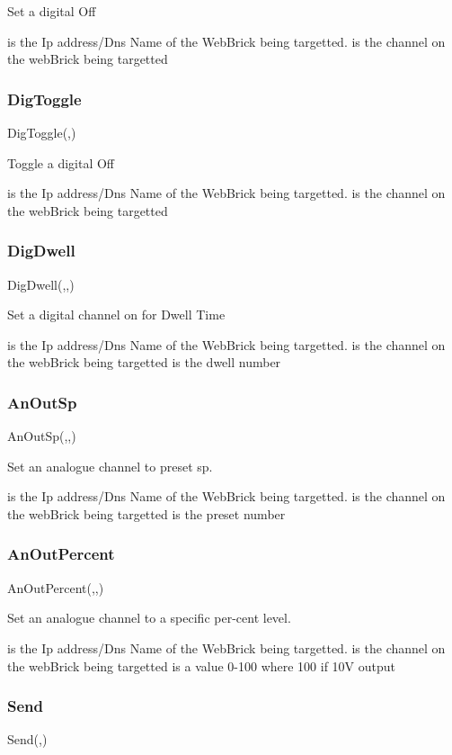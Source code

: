 Set a digital Off

     is the Ip address/Dns Name of the WebBrick being targetted.
     is the channel on the webBrick being targetted

\subsubsection{DigToggle}
DigToggle(,)

Toggle a digital Off

     is the Ip address/Dns Name of the WebBrick being targetted.
     is the channel on the webBrick being targetted

\subsubsection{DigDwell}
DigDwell(,,)

Set a digital channel on for Dwell Time

     is the Ip address/Dns Name of the WebBrick being targetted.
     is the channel on the webBrick being targetted
     is the dwell number

\subsubsection{AnOutSp}
AnOutSp(,,) 

Set an analogue channel to preset sp.

         is the Ip address/Dns Name of the WebBrick being targetted.
         is the channel on the webBrick being targetted
         is the preset number


\subsubsection{AnOutPercent}
AnOutPercent(,,)

Set an analogue channel to a specific per-cent level.

     is the Ip address/Dns Name of the WebBrick being targetted.
     is the channel on the webBrick being targetted
     is a value 0-100 where 100 if 10V output

\subsubsection{Send}
Send(,)

